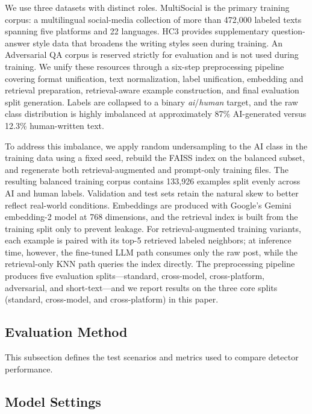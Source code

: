 \documentclass[letterpaper]{article} %
\begin{document}
We use three datasets with distinct roles. MultiSocial \cite{multisocial2025} is the primary training corpus: a multilingual social-media collection of more than 472{,}000 labeled texts spanning five platforms and 22 languages. HC3 \cite{guo2023hc3} provides supplementary question-answer style data that broadens the writing styles seen during training. An Adversarial QA corpus is reserved strictly for evaluation and is not used during training. We unify these resources through a six-step preprocessing pipeline covering format unification, text normalization, label unification, embedding and retrieval preparation, retrieval-aware example construction, and final evaluation split generation. Labels are collapsed to a binary \textit{ai}/\textit{human} target, and the raw class distribution is highly imbalanced at approximately 87\% AI-generated versus 12.3\% human-written text.

To address this imbalance, we apply random undersampling to the AI class in the training data using a fixed seed, rebuild the FAISS \cite{johnson2019faiss} index on the balanced subset, and regenerate both retrieval-augmented and prompt-only training files. The resulting balanced training corpus contains 133{,}926 examples split evenly across AI and human labels. Validation and test sets retain the natural skew to better reflect real-world conditions. Embeddings are produced with Google's Gemini embedding-2 model at 768 dimensions, and the retrieval index is built from the training split only to prevent leakage. For retrieval-augmented training variants, each example is paired with its top-5 retrieved labeled neighbors; at inference time, however, the fine-tuned LLM path consumes only the raw post, while the retrieval-only KNN path queries the index directly. The preprocessing pipeline produces five evaluation splits---standard, cross-model, cross-platform, adversarial, and short-text---and we report results on the three core splits (standard, cross-model, and cross-platform) in this paper.

\subsection{Evaluation Method}

This subsection defines the test scenarios and metrics used to compare detector performance.

\subsection{Model Settings}
\end{document}
